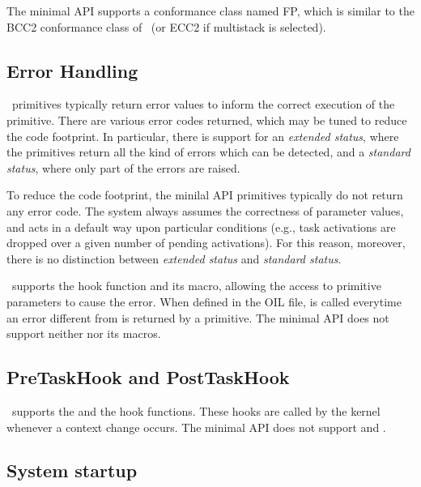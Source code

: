 \documentclass[12pt,a4paper,normalheadings,titlepage]{scrreprt}
\begin{document}
The minimal API supports a conformance class named FP, which is similar to the 
BCC2 conformance class of \ee\ (or ECC2 if multistack is selected). 


\subsection{Error Handling}

\ee\ primitives typically return error values to inform the correct
execution of the primitive. There are various error codes returned,
which may be tuned to reduce the code footprint. In particular, there
is support for an {\em extended status}, where the primitives return
all the kind of errors which can be detected, and a {\em standard
status}, where only part of the errors are raised. 

To reduce the code footprint, the minilal API primitives typically do not return 
any error code. The system always assumes the correctness of
parameter values, and acts in a default way upon particular conditions 
(e.g., task activations are dropped over a given number of pending 
activations). For this reason, moreover, there is no distinction between 
{\em extended status} and {\em standard status}. 

\ee\ supports the  hook function and its macro,
allowing the access to primitive parameters to cause the
error. When defined in the OIL file,  is called
everytime an error different from  is returned by a
primitive. The minimal API does not support neither  nor its
macros.


\subsection{PreTaskHook and PostTaskHook}

\ee\ supports the  and the  hook
functions. These hooks are called by the kernel whenever a context
change occurs. The minimal API does not support  and
.


\subsection{System startup}
\end{document}
